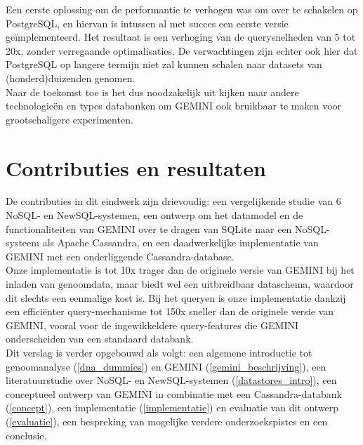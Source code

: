 Een eerste oplossing om de performantie te verhogen was om over te schakelen op PostgreSQL, en hiervan is intussen al met succes een eerste versie ge\"implementeerd. Het resultaat is een verhoging van de querysnelheden van 5 tot 20x, zonder verregaande optimalisaties. De verwachtingen zijn echter ook hier dat PostgreSQL op langere termijn niet zal kunnen schalen naar datasets van (honderd)duizenden genomen.\\
Naar de toekomst toe is het dus noodzakelijk uit kijken naar andere technologie\"en en types databanken om GEMINI ook bruikbaar te maken voor grootschaligere experimenten.

\section{Contributies en resultaten}

De contributies in dit eindwerk zijn drievoudig: een vergelijkende studie van 6 NoSQL- en NewSQL-systemen, een ontwerp om het datamodel en de functionaliteiten van GEMINI over te dragen van SQLite naar een NoSQL-systeem als Apache Cassandra, en een daadwerkelijke implementatie van GEMINI met een onderliggende Cassandra-database.\\
Onze implementatie is tot 10x trager dan de originele versie van GEMINI bij het inladen van genoomdata, maar biedt wel een uitbreidbaar dataschema, waardoor dit slechts een eenmalige kost is. Bij het queryen is onze implementatie dankzij een effici\"enter query-mechanisme tot 150x sneller dan de originele versie van GEMINI, vooral voor de ingewikkeldere query-features die GEMINI onderscheiden van een standaard databank.\\

Dit verslag is verder opgebouwd als volgt: een algemene introductie tot genoomanalyse (\ref{dna_dummies}) en GEMINI (\ref{gemini_beschrijving}), een literatuurstudie over NoSQL- en NewSQL-systemen (\ref{datastores_intro}), een conceptueel ontwerp van GEMINI in combinatie met een Cassandra-databank (\ref{concept}), een implementatie (\ref{implementatie}) en evaluatie van dit ontwerp (\ref{evaluatie}), een bespreking van mogelijke verdere onderzoekspistes en een conclusie.


